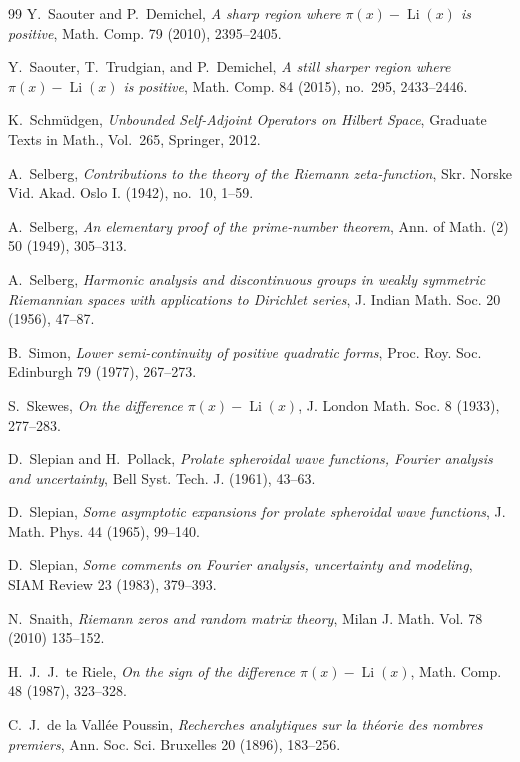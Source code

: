 \documentclass{article}
\begin{document}
\begin{thebibliography}{99}
Y.~Saouter and P.~Demichel, 
\emph{A sharp region where $\pi(x) - \operatorname{Li}(x)$ is positive}, 
Math. Comp. 79 (2010), 2395--2405.

Y.~Saouter, T.~Trudgian, and P.~Demichel, 
\emph{A still sharper region where $\pi(x) - \operatorname{Li}(x)$ is positive}, 
Math. Comp. 84 (2015), no.~295, 2433--2446.

K.~Schmüdgen, 
\emph{Unbounded Self-Adjoint Operators on Hilbert Space}, 
Graduate Texts in Math., Vol.~265, Springer, 2012.

A.~Selberg, 
\emph{Contributions to the theory of the Riemann zeta-function}, 
Skr. Norske Vid. Akad. Oslo I. (1942), no.~10, 1--59.

A.~Selberg, 
\emph{An elementary proof of the prime-number theorem}, 
Ann. of Math. (2) 50 (1949), 305--313.

A.~Selberg, 
\emph{Harmonic analysis and discontinuous groups in weakly symmetric Riemannian spaces with applications to Dirichlet series}, 
J. Indian Math. Soc. 20 (1956), 47--87.

B.~Simon, 
\emph{Lower semi-continuity of positive quadratic forms}, 
Proc. Roy. Soc. Edinburgh 79 (1977), 267--273.

S.~Skewes, 
\emph{On the difference $\pi(x) - \operatorname{Li}(x)$}, 
J. London Math. Soc. 8 (1933), 277--283.

D.~Slepian and H.~Pollack, 
\emph{Prolate spheroidal wave functions, Fourier analysis and uncertainty}, 
Bell Syst. Tech. J. (1961), 43--63.  

D.~Slepian, 
\emph{Some asymptotic expansions for prolate spheroidal wave functions},  
J. Math. Phys. 44 (1965), 99--140.

D.~Slepian, 
\emph{Some comments on Fourier analysis, uncertainty and modeling},  
SIAM Review 23 (1983), 379--393.

 N.~Snaith, \emph{ Riemann zeros and random matrix theory}, Milan J. Math. Vol. 78 (2010) 135--152.

H.~J.~J.~te Riele, 
\emph{On the sign of the difference $\pi(x) - \operatorname{Li}(x)$}, 
Math. Comp. 48 (1987), 323--328.

C.~J.~de la Vallée Poussin, 
\emph{Recherches analytiques sur la théorie des nombres premiers}, 
Ann. Soc. Sci. Bruxelles 20 (1896), 183--256.


\end{thebibliography}
\end{document}
